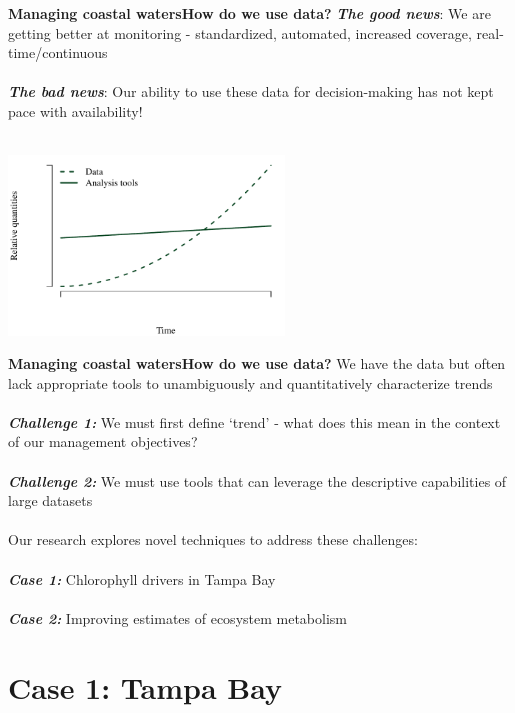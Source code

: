 \documentclass[serif]{beamer}\usepackage[]{graphicx}\usepackage[]{color}
\newcommand{\emtxt}[1]{\textbf{\textit{#1}}}
\begin{document}
\begin{frame}{\textbf{Managing coastal waters}}{\textbf{How do we use data?}}
\emtxt{The good news}: We are getting better at monitoring - standardized, automated, increased coverage, real-time/continuous \\~\\
\emtxt{The bad news}: Our ability to use these data for decision-making has not kept pace with availability! \\~\\


{\centering \includegraphics[width=0.55\textwidth]{fig/theo} 

}



\end{frame}

\begin{frame}{\textbf{Managing coastal waters}}{\textbf{How do we use data?}}
We have the data but often lack appropriate tools to unambiguously and quantitatively characterize trends \\~\\
\emtxt{Challenge 1:} We must first define  `trend' - what does this mean in the context of our management objectives? \\~\\
\emtxt{Challenge 2:} We must use tools that can leverage the descriptive capabilities of large datasets \\~\\
Our research explores novel techniques to address these challenges:\\~\\
\emtxt{Case 1:} Chlorophyll drivers in Tampa Bay \\~\\
\emtxt{Case 2:} Improving estimates of ecosystem metabolism 
\end{frame}

\section{Case 1: Tampa Bay}
\end{document}
